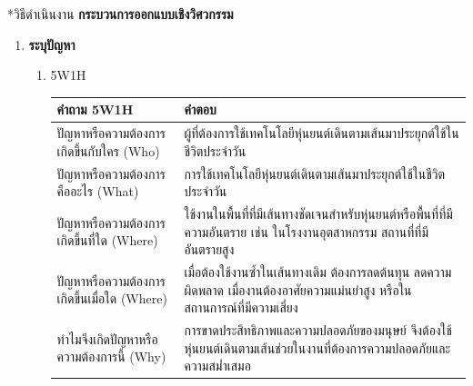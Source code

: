\documentclass[14pt, fleqn, a4paper]{extarticle}
\makeatletter
\renewcommand\section{%
  \@ifstar{\flatsection}{\@section}%
}
\newcommand{\flatsection}[1]{%
   \par\medskip\noindent
   {\bfseries #1\par}
}
\makeatother
\begin{document}
\section*{วิธีดำเนินงาน}
\textbf{กระบวนการออกแบบเชิงวิศวกรรม}
\begin{enumerate}
	\item \textbf{ระบุปัญหา}
	\begin{enumerate}
		\item 5W1H \\
			\begin{table}[H]
			\centering
			\renewcommand{\arraystretch}{1.35}
			\setlength{\tabcolsep}{8pt}

			\begin{tabular}{>{\centering\arraybackslash}p{5cm} p{10cm}}
			\hline
			\centering\textbf{คำถาม 5W1H} & 
			\centering\textbf{คำตอบ} \tabularnewline
			\hline

			ปัญหาหรือความต้องการเกิดขึ้นกับใคร (Who) &
			ผู้ที่ต้องการใช้เทคโนโลยีหุ่นยนต์เดินตามเส้นมาประยุกต์ใช้ในชีวิตประจำวัน
			\\ \hline

			ปัญหาหรือความต้องการคืออะไร (What) &
			การใช้เทคโนโลยีหุ่นยนต์เดินตามเส้นมาประยุกต์ใช้ในชีวิตประจำวัน
			\\ \hline

			ปัญหาหรือความต้องการเกิดขึ้นที่ใด (Where) &
			ใช้งานในพื้นที่ที่มีเส้นทางชัดเจนสำหรับหุ่นยนต์หรือพื้นที่ที่มีความอันตราย เช่น  
			ในโรงงานอุตสาหกรรม สถานที่ที่มีอันตรายสูง
			\\ \hline

			ปัญหาหรือความต้องการเกิดขึ้นเมื่อใด (Where) &
			เมื่อต้องใช้งานซ้ำในเส้นทางเดิม ต้องการลดต้นทุน ลดความผิดพลาด เมื่องานต้องอาศัยความแม่นยำสูง หรือในสถานการณ์ที่มีความเสี่ยง
			\\ \hline

			ทำไมจึงเกิดปัญหาหรือความต้องการนี้ (Why) &
			การขาดประสิทธิภาพและความปลอดภัยของมนุษย์ จึงต้องใช้หุ่นยนต์เดินตามเส้นช่วยในงานที่ต้องการความปลอดภัยและความสม่ำเสมอ
			\\ \hline


\end{tabular}
\end{table}
\end{enumerate}
\end{enumerate}
\end{document}
